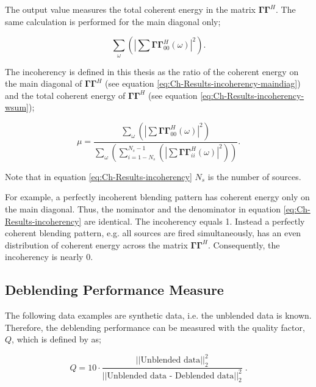  The output value measures the total coherent energy in the matrix $\mathbf{\Gamma \Gamma}^H$. The same calculation is performed for the main diagonal only;
 
 \begin{equation}
 	\sum_{\omega} \left( \left| \sum \mathbf{\Gamma \Gamma}^H_{00} (\omega) \right|^2  \right).
 	\label{eq:Ch-Results-incoherency-maindiag}
 \end{equation} 

 The incoherency is defined in this thesis as the ratio of the coherent energy on the main diagonal of $\mathbf{\Gamma \Gamma}^H$ (see equation \ref{eq:Ch-Results-incoherency-maindiag}) and the total coherent energy of $\mathbf{\Gamma \Gamma}^H$ (see equation \ref{eq:Ch-Results-incoherency-wsum});

\begin{equation}
	\mu = \frac{  \sum_{\omega} \left( \left| \sum \mathbf{\Gamma \Gamma}^H_{00} (\omega) \right|^2  \right)  }{  \sum_{\omega} \left( \sum_{i = 1-N_s}^{N_s-1}	 \left( \left| \sum \mathbf{\Gamma \Gamma}^H_{ii} (\omega) \right|^2 \right) \right)  }.
	\label{eq:Ch-Results-incoherency}
\end{equation}

Note that in equation \ref{eq:Ch-Results-incoherency} $N_s$ is the number of sources.

For example, a perfectly incoherent blending pattern has coherent energy only on the main diagonal. Thus, the nominator and the denominator in equation \ref{eq:Ch-Results-incoherency} are identical. The incoherency equals 1. Instead a perfectly coherent blending pattern, e.g. all sources are fired simultaneously, has an even distribution of coherent energy across the matrix $\mathbf{\Gamma \Gamma}^H$. Consequently, the incoherency is nearly 0.



\subsection*{Deblending Performance Measure}

The following data examples are synthetic data, i.e. the unblended data is known. Therefore, the deblending performance can be measured with the quality factor, $Q$, which is defined by \citet{IbrahimQuality} as;

\begin{equation}
	Q = 10 \cdot \frac{\left|\left|\text{Unblended data}\right|\right| _2 ^2}{\left|\left|\text{Unblended data - Deblended data}\right|\right| _2 ^2} \;.	
\end{equation}

